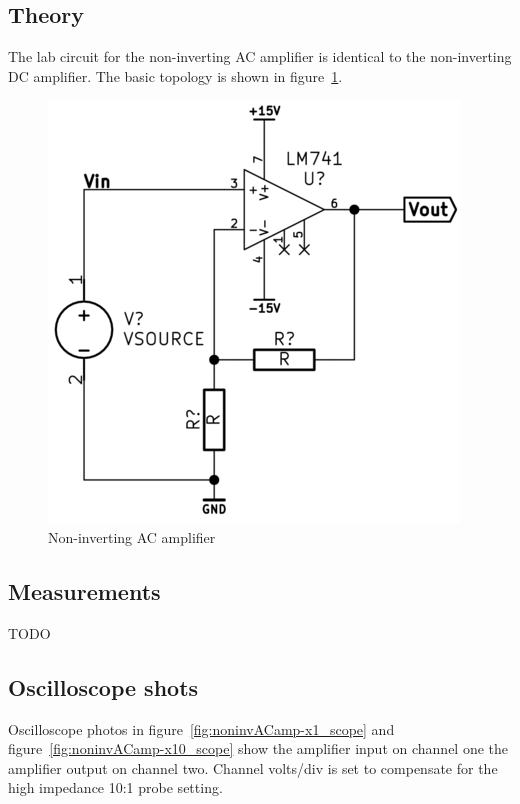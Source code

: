 \documentclass[11pt,a4paper]{article}
\begin{document}
\subsection{Theory}\label{noninvAC-theory}
The lab circuit for the non-inverting AC amplifier is identical to the
non-inverting DC amplifier. The basic topology is shown in
figure~\ref{fig:noninvACamp}.

\begin{figure}[htbp]
    \centering
    \includegraphics[scale=0.5]{img/noninvACamp.png}
    \caption{Non-inverting AC amplifier}
    \label{fig:noninvACamp}
\end{figure}


\subsection{Measurements}\label{measurements-3}
TODO


\subsection{Oscilloscope shots}\label{noninvAC-oscilloscope-shots}
Oscilloscope photos in figure~\ref{fig:noninvACamp-x1_scope} and
figure~\ref{fig:noninvACamp-x10_scope} show the amplifier input on channel one
the amplifier output on channel two.  Channel volts/div is set to compensate
for the high impedance 10:1 probe setting. 
\end{document}
